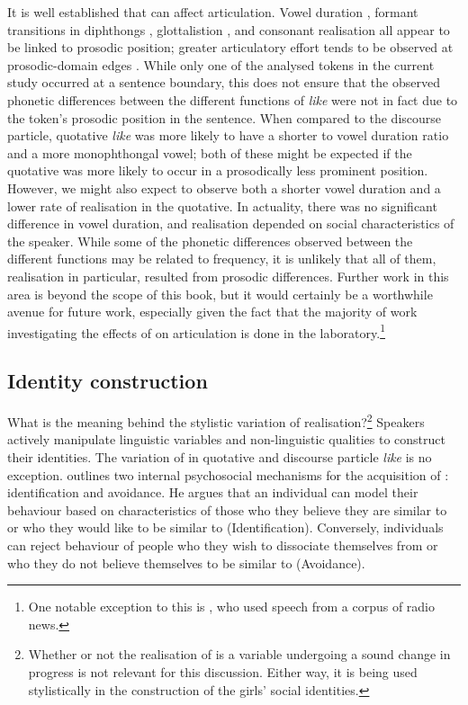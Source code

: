 It is well established that  can affect articulation. Vowel duration \citep{edwardsbeckman1992}, formant transitions in diphthongs \citep{woutersmacon2002}, glottalistion \citep{dilleyetal1996}, and consonant realisation \citep{fougeronkeating1997} all appear to be linked to prosodic position; greater articulatory effort tends to be observed at prosodic-domain edges \citep{fougeronkeating1997}. While only one of the analysed tokens in the current study occurred at a sentence boundary, this does not ensure that the observed phonetic differences between the different functions of \textit{like} were not in fact due to the token's prosodic position in the sentence. When compared to the discourse particle, quotative \textit{like} was more likely to have a shorter  to vowel duration ratio and a more monophthongal vowel; both of these might be expected if the quotative was more likely to occur in a prosodically less prominent position. However, we might also expect to observe both a shorter vowel duration and a lower rate of  realisation in the quotative. In actuality, there was no significant difference in vowel duration, and  realisation depended on social characteristics of the speaker. While some of the phonetic differences observed between the different functions may be related to frequency, it is unlikely that all of them,  realisation in particular, resulted from prosodic differences. Further work in this area is beyond the scope of this book, but it would certainly be a worthwhile avenue for future work, especially given the fact that the majority of work investigating the effects of  on articulation is done in the laboratory.\footnote{One notable exception to this is \citet{coleetal2007}, who used speech from a corpus of radio news.\nocite{coleetal2007}} 

\subsection{Identity construction}\label{sec:idconstruction}

 

What is the meaning behind the stylistic variation of  realisation?\footnote{Whether or not the realisation of  is a variable undergoing a sound change in progress is not relevant for this discussion. Either way, it is being used stylistically in the construction of the girls' social identities.} Speakers actively manipulate linguistic variables and non-linguistic qualities to construct their identities. The variation of  in quotative and discourse particle \textit{like} is no exception. \citet{zwicky1997} outlines two internal psychosocial mechanisms for the acquisition of : identification and avoidance. He argues that an individual can model their behaviour based on characteristics of those who they believe they are similar to or who they would like to be similar to (Identification). Conversely, individuals can reject behaviour of people who they wish to dissociate themselves from or who they do not believe themselves to be similar to (Avoidance).

